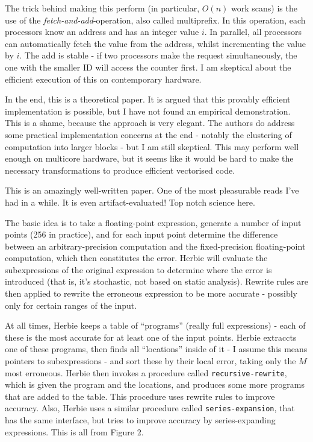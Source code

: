 \documentclass[a4paper, oneside, final]{memoir}
\begin{document}
The trick behind making this perform (in particular, $O(n)$ work
scans) is the use of the \textit{fetch-and-add}-operation, also called
multiprefix.  In this operation, each processors know an address and
has an integer value $i$.  In parallel, all processors can
automatically fetch the value from the address, whilst incrementing
the value by $i$.  The add is stable - if two processors make the
request simultaneously, the one with the smaller ID will access the
counter first.  I am skeptical about the efficient execution of this
on contemporary hardware.

In the end, this is a theoretical paper.  It is argued that this
provably efficient implementation is possible, but I have not found an
empirical demonstration.  This is a shame, because the approach is
very elegant.  The authors do address some practical implementation
concerns at the end - notably the clustering of computation into
larger blocks - but I am still skeptical.  This may perform well
enough on multicore hardware, but it seems like it would be hard to
make the necessary transformations to produce efficient vectorised
code.

\begin{quote}
\end{quote}

This is an amazingly well-written paper.  One of the most pleasurable
reads I've had in a while.  It is even artifact-evaluated!  Top notch
science here.

The basic idea is to take a floating-point expression, generate a
number of input points (256 in practice), and for each input point
determine the difference between an arbitrary-precision computation
and the fixed-precision floating-point computation, which then
constitutes the error.  Herbie will evaluate the subexpressions of the
original expression to determine where the error is introduced (that
is, it's stochastic, not based on static analysis).  Rewrite rules are
then applied to rewrite the erroneous expression to be more accurate -
possibly only for certain ranges of the input.

At all times, Herbie keeps a table of ``programs'' (really full
expressions) - each of these is the most accurate for at least one of
the input points.  Herbie extraccts one of these programs, then finds
all ``locations'' inside of it - I assume this means pointers to
subexpressions - and sort these by their local error, taking only the
$M$ most erroneous.  Herbie then invokes a procedure called
\texttt{recursive-rewrite}, which is given the program and the
locations, and produces some more programs that are added to the
table.  This procedure uses rewrite rules to improve accuracy.  Also,
Herbie uses a similar procedure called \texttt{series-expansion}, that
has the same interface, but tries to improve accuracy by
series-expanding expressions.  This is all from Figure 2.
\end{document}

